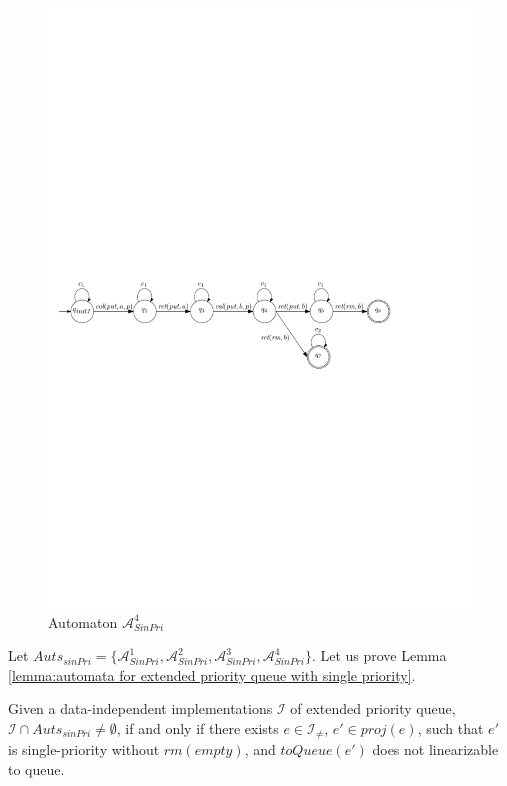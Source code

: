 \begin{figure}[htbp]
  \centering
  \includegraphics[width=0.9 \textwidth]{figures/PIC_AUTO_FIFO_4.pdf}
  \caption{Automaton $\mathcal{A}_{\textit{SinPri}}^4$}
  \label{fig:automata for FIFO-4}
\end{figure}

Let $\textit{Auts}_{\textit{sinPri}} = \{ \mathcal{A}_{\textit{SinPri}}^1, \mathcal{A}_{\textit{SinPri}}^2, \mathcal{A}_{\textit{SinPri}}^3, \mathcal{A}_{\textit{SinPri}}^4 \}$. Let us prove Lemma \ref{lemma:automata for extended priority queue with single priority}.

\begin{lemma}\label{lemma:automata for extended priority queue with single priority}
Given a data-independent implementations $\mathcal{I}$ of extended priority queue, $\mathcal{I} \cap \textit{Auts}_{\textit{sinPri}} \neq \emptyset$, if and only if there exists $e \in \mathcal{I}_{\neq}$, $e' \in \textit{proj}(e)$, such that $e'$ is single-priority  without $\textit{rm}(\textit{empty})$, and $\textit{toQueue}(e')$ does not linearizable to queue.
\end{lemma}

